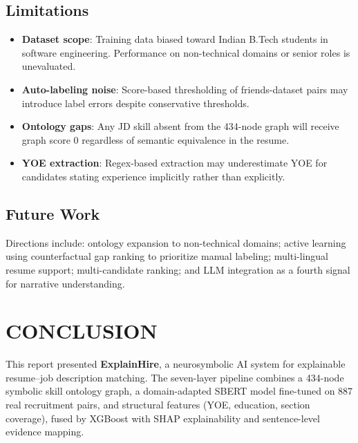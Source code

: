 \documentclass[12pt,a4paper]{report}
\begin{document}
\section{Limitations}

\begin{itemize}[noitemsep]
  \item \textbf{Dataset scope}: Training data biased toward Indian B.Tech students in software engineering. Performance on non-technical domains or senior roles is unevaluated.
  \item \textbf{Auto-labeling noise}: Score-based thresholding of friends-dataset pairs may introduce label errors despite conservative thresholds.
  \item \textbf{Ontology gaps}: Any JD skill absent from the 434-node graph will receive graph score 0 regardless of semantic equivalence in the resume.
  \item \textbf{YOE extraction}: Regex-based extraction may underestimate YOE for candidates stating experience implicitly rather than explicitly.
\end{itemize}

\section{Future Work}

Directions include: ontology expansion to non-technical domains; active learning using counterfactual gap ranking to prioritize manual labeling; multi-lingual resume support; multi-candidate ranking; and LLM integration as a fourth signal for narrative understanding.

\chapter{CONCLUSION}

This report presented \textbf{ExplainHire}, a neurosymbolic AI system for explainable resume--job description matching. The seven-layer pipeline combines a 434-node symbolic skill ontology graph, a domain-adapted SBERT model fine-tuned on 887 real recruitment pairs, and structural features (YOE, education, section coverage), fused by XGBoost with SHAP explainability and sentence-level evidence mapping.
\end{document}
